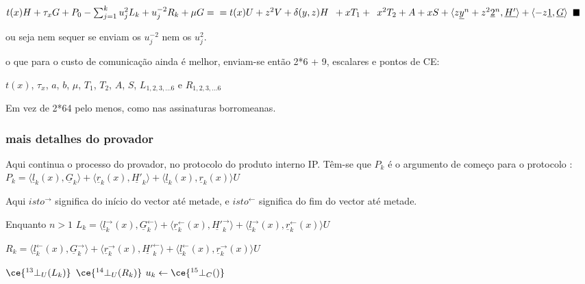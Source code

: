 $t(x) H + \bold{\tau}_x G + P_0 - \sum_{j=1}^{k} u_{j}^{2}L_k + u_{j}^{-2}R_k + \mu G=\\= t(x) U + z^2 V + \delta(y, z) H \enspace+ x T_1 +\enspace x^2 T_2 + A + x S + \langle z\underline{y}^n + z^2\underline{2}^n,\underline{H'}\rangle + \langle -z\underline{1},\underline{G}\rangle$
$\hspace*{\fill} \blacksquare$

ou seja nem sequer se enviam os $u_{j}^{-2}$ nem os $u_{j}^{2}$.

o que para o custo de comunicação ainda é melhor, enviam-se então 2*6 + 9, escalares e pontos de CE:

$t(x)$, $\tau_x$, $a$, $b$, $\mu$, $T_1$, $T_2$, $A$, $S$, $L_{1,2,3,...6}$ e $R_{1,2,3,...6}$ 


Em vez de 2*64 pelo menos, como nas assinaturas borromeanas. 
\newpage
\subsubsection{mais detalhes do provador}
\label{sec:bullet_detalhes}

Aqui continua o processo do provador, no protocolo do produto interno IP. Têm-se que $P_k$ é o argumento de começo para o protocolo :\newline
$P_k = \langle \underline{l}_k(x),\underline{G}_k\rangle + \langle \underline{r}_k(x),\underline{H'}_k\rangle + \langle \underline{l}_k(x), \underline{r}_k(x)\rangle U$

Aqui $isto^{\rightarrow}$ significa do início do vector até metade, e $isto^{\leftarrow}$ significa do fim do vector até metade.

Enquanto $n>1$\newline
$L_k = \langle \underline{l}^{\rightarrow}_{k}(x),\underline{G}^{\leftarrow}_{k}\rangle + \langle \underline{r}^{\leftarrow}_{k}(x),\underline{H'}^{\rightarrow}_{k}\rangle + \langle \underline{l}^{\rightarrow}_{k}(x), \underline{r}^{\leftarrow}_{k}(x)\rangle U$

$R_k = \langle \underline{l}^{\leftarrow}_{k}(x),\underline{G}^{\rightarrow}_{k}\rangle + \langle \underline{r}^{\rightarrow}_{k}(x),\underline{H'}^{\leftarrow}_{k}\rangle + \langle \underline{l}^{\leftarrow}_{k}(x), \underline{r}^{\rightarrow}_{k}(x)\rangle U$

\hspace*{\fill} $\ce{^{13}_{\ }\bot_U(L_k)}$ \newline
\hspace*{\fill} $\ce{^{14}_{\ }\bot_U(R_k)}$ \newline
$u_{k}\leftarrow \ce{^{15}_{\ }\bot_C()}$\newline


